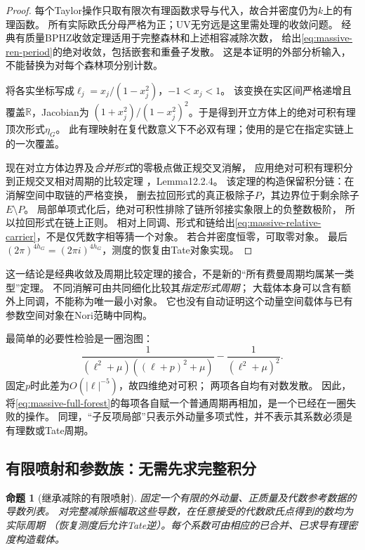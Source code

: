 \documentclass[11pt,a4paper]{ctexart}
\theoremstyle{cnplain}\newtheorem{theorem}{定理}[section]
\newtheorem{proposition}[theorem]{命题}
\theoremstyle{definition}\newtheorem{definition}[theorem]{定义}
\theoremstyle{remark}\newtheorem{remark}[theorem]{注}
\begin{document}
\begin{proof}
每个Taylor操作只取有限次有理函数求导与代入，故合并密度仍为$k$上的有理函数。
所有实际欧氏分母严格为正；UV无穷远是这里需处理的收敛问题。
经典有质量BPHZ收敛定理适用于完整森林和上述相容减除次数，
给出\eqref{eq:massive-ren-period}的绝对收敛，包括嵌套和重叠子发散。
这是本证明的外部分析输入，不能替换为对每个森林项分别计数。

将各实坐标写成$\ell_j=x_j/(1-x_j^2)$，$-1<x_j<1$。
该变换在实区间严格递增且覆盖$\mathbb R$，Jacobian为
$(1+x_j^2)/(1-x_j^2)^2$。于是得到开立方体上的绝对可积有理顶次形式$\eta_G$。
此有理映射在复代数意义下不必双有理；使用的是它在指定实链上的一次覆盖。

现在对立方体边界及\emph{合并形式}的零极点做正规交叉消解，
应用绝对可积有理积分到正规交叉相对周期的比较定理
\cite{HMSMass}，Lemma12.2.4。
该定理的构造保留积分链：在消解空间中取链的严格变换，
删去拉回形式的真正极除子$P$，其边界位于剩余除子$E\setminus P$。
局部单项式化后，绝对可积性排除了链所邻接实象限上的负整数极阶，
所以拉回形式在链上正则。
相对上同调、形式和链给出\eqref{eq:massive-relative-carrier}，不是仅凭数字相等猜一个对象。
若合并密度恒零，可取零对象。
最后$(2\pi)^{4h_G}=(2\pi i)^{4h_G}$，测度的恢复由Tate对象实现。
\end{proof}

这一结论是经典收敛及周期比较定理的接合，不是新的“所有费曼周期均属某一类型”定理。
不同消解可由共同细化比较其\emph{指定形式周期}；
大载体本身可以含有额外上同调，不能称为唯一最小对象。
它也没有自动证明这个动量空间载体与已有参数空间对象在Nori范畴中同构。

最简单的必要性检验是一圈泡图：
\begin{equation}
 \frac1{(\ell^2+\mu)((\ell+p)^2+\mu)}
 -\frac1{(\ell^2+\mu)^2}.
 \label{eq:massive-bubble-cancel}
\end{equation}
固定$p$时此差为$O(|\ell|^{-5})$，故四维绝对可积；
两项各自均有对数发散。
因此，将\eqref{eq:massive-full-forest}的每项各自赋一个普通周期再相加，是一个已经在一圈失败的操作。
同理，“子反项局部”只表示外动量多项式性，并不表示其系数必须是有理数或Tate周期。

\subsection{有限喷射和参数族：无需先求完整积分}

\begin{proposition}[继承减除的有限喷射]
\label{prop:massive-jets}
固定一个有限的外动量、正质量及代数参考数据的导数列表。
对完整减除振幅取这些导数，在任意接受的代数欧氏点得到的数均为实际周期
（恢复测度后允许Tate逆）。每个系数可由相应的\emph{已合并、已求导}有理密度构造载体。
\end{proposition}
\end{document}
